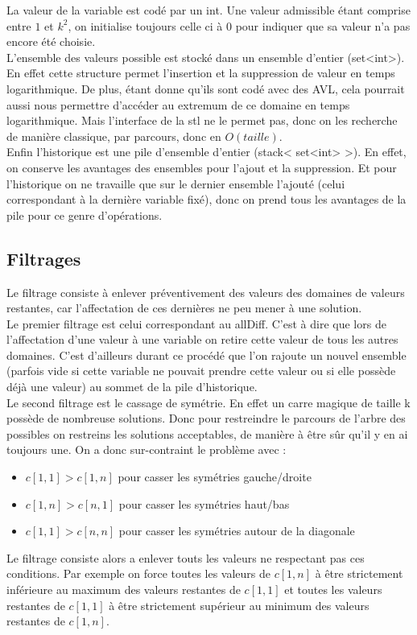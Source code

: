 \documentclass[12pt,a4paper]{article}
\begin{document}
La valeur de la variable est codé par un int. Une valeur admissible étant comprise entre $1$ et $k^2$, on initialise toujours celle ci à 0 pour indiquer que sa valeur n'a pas encore été choisie.\\
L’ensemble des valeurs possible est stocké dans un ensemble d'entier (set\textless int\textgreater). En effet cette structure permet l'insertion et la suppression de valeur en temps logarithmique. De plus, étant donne qu'ils sont codé avec des AVL, cela pourrait aussi nous permettre d’accéder au extremum de ce domaine en temps logarithmique. Mais l'interface de la stl ne le permet pas, donc on les recherche de manière classique, par parcours, donc en $O(taille)$.\\
Enfin l'historique est une pile d'ensemble d'entier (stack< set<int> >). En effet, on conserve les avantages des ensembles pour l'ajout et la suppression. Et pour l'historique on ne travaille que sur le dernier ensemble l'ajouté (celui correspondant à la dernière variable fixé), donc on prend tous les avantages de la pile pour ce genre d’opérations.\\

\subsection{Filtrages}

Le filtrage consiste à enlever préventivement des valeurs des domaines de valeurs restantes, car l'affectation de ces dernières ne peu mener à une solution.\\

Le premier filtrage est celui correspondant au allDiff. C'est à dire que lors de l'affectation d'une valeur à une variable on retire cette valeur de tous les autres domaines. C'est d’ailleurs durant ce procédé que l'on rajoute un nouvel ensemble (parfois vide si cette variable ne pouvait prendre cette valeur ou si elle possède déjà une valeur) au sommet de la pile d'historique.\\

Le second filtrage est le cassage de symétrie. En effet un carre magique de taille k possède de nombreuse solutions. Donc pour restreindre le parcours de l'arbre des possibles on restreins les solutions acceptables, de manière à être sûr qu'il y en ai toujours une. On a donc sur-contraint le problème avec :
\begin{itemize}
\item
$c\left[1,1\right] > c\left[1,n\right]$ pour casser les symétries gauche/droite
\item
$c\left[1,n\right] > c\left[n,1\right]$ pour casser les symétries haut/bas
\item
$c\left[1,1\right] > c\left[n,n\right]$ pour casser les symétries autour de la diagonale
\end{itemize}
Le filtrage consiste alors a enlever touts les valeurs ne respectant pas ces conditions. Par exemple on force toutes les valeurs de $c\left[1,n\right]$ à être strictement inférieure au maximum des valeurs restantes de $c\left[1,1\right]$ et toutes les valeurs restantes de $c\left[1,1\right]$ à être strictement supérieur au minimum des valeurs restantes de $c\left[1,n\right]$.\\
\end{document}
